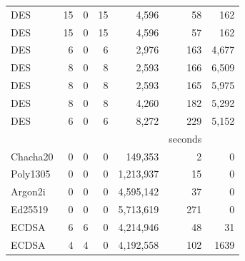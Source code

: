 \begin{table}[]
\begin{threeparttable}
\begin{tabular}{l@{}r@{~~}rrr@{~~}rr}
      DES\tnote{1}                & 15                     & 0                   & 15                   & 4,596        & 58      & 162          \\
      DES\tnote{2}                & 15                     & 0                   & 15                   & 4,596        & 57      & 162           \\
      DES\tnote{4}                & 6                      & 0                   & 6                    & 2,976         & 163    & 4,677         \\
      DES\tnote{5}                & 8                      & 0                   & 8                    & 2,593         & 166    & 6,509        \\
      DES\tnote{6}                & 8                      & 0                   & 8                    & 2,593        & 165    & 5,975        \\
      DES\tnote{7}                & 8                      & 0                   & 8                    & 4,260         & 182    & 5,292        \\
      DES\tnote{8}                & 6                      & 0                   & 6                    & 8,272         & 229     & 5,152      \\
                         &                        &                     &                      &                  & seconds                  \\
      Chacha20\tnote{3}           & 0                      & 0                   & 0                    & 149,353        & 2     & 0             \\  
      Poly1305\tnote{3}           & 0                      & 0                   & 0                    & 1,213,937      & 15    & 0             \\
      Argon2i\tnote{3}            & 0                      & 0                   & 0                    & 4,595,142       & 37    & 0             \\
      Ed25519\tnote{3}            & 0                      & 0                   & 0                    & 5,713,619       & 271   & 0            \\
      ECDSA\tnote{1}              & 6                      &    6                & 0                    &  4,214,946     &  48   &   31       \\ 
      ECDSA\tnote{2}              &   4                   &   4                 & 0                    &  4,192,558    & 102   & 1639          \\   

\end{tabular}
\end{threeparttable}
\end{table}
